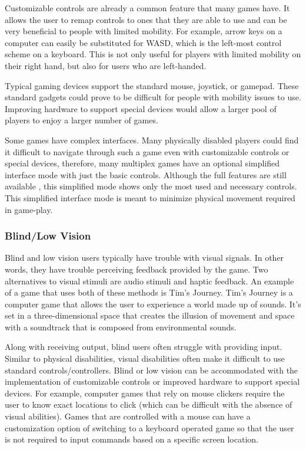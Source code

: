 \documentclass[10pt,twocolumn]{article}
\begin{document}
    Customizable controls are already a common feature that many games have. It allows the user to remap controls to ones that they are able to use and can be very beneficial to people with limited mobility. For example, arrow keys on a computer can easily be substituted for WASD, which is the left-most control scheme on a keyboard. This is not only useful for players with limited mobility on their right hand, but also for users who are left-handed. 

    Typical gaming devices support the standard mouse, joystick, or gamepad. These standard gadgets could prove to be difficult for people with mobility issues to use. Improving hardware to support special devices would allow a larger pool of players to enjoy a larger number of games. 

    Some games have complex interfaces. Many physically disabled players could find it difficult to navigate through such a game even with customizable controls or special devices, therefore, many multiplex games have an optional simplified interface mode with just the basic controls. Although the full features are still available , this simplified mode shows only the most used and necessary controls. This simplified interface mode is meant to minimize physical movement required in game-play.

\subsubsection{Blind/Low Vision}
    Blind and low vision users typically have trouble with visual signals. In other words, they have trouble perceiving feedback provided by the game. \cite{eskelinen2001gaming} Two alternatives to visual stimuli are audio stimuli and haptic feedback. An example of a game that uses both of these methods is Tim's Journey. Tim's Journey is a computer game that allows the user to experience a world made up of sounds. \cite{eskelinen2001gaming} It's set in a three-dimensional space that creates the illusion of movement and space with a soundtrack that is composed from environmental sounds. \cite{eskelinen2001gaming}
    
    Along with receiving output, blind users often struggle with providing input. Similar to physical disabilities, visual disabilities often make it difficult to use standard controls/controllers. Blind or low vision can be accommodated with the implementation of customizable controls or improved hardware to support special devices. For example, computer games that rely on mouse clickers require the user to know exact locations to click (which can be difficult with the absence of visual abilities). Games that are controlled with a mouse can have a customization option of switching to a keyboard operated game so that the user is not required to input commands based on a specific screen location.
\end{document}
